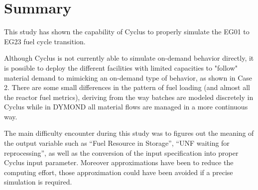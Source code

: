 \documentclass[12pt]{article}
\begin{document}
\section{Summary}

This study has shown the capability of Cyclus to properly simulate the EG01 to
EG23 fuel cycle transition.   

Although Cyclus is not currently able to simulate on-demand behavior directly,
it is possible to deploy the different facilities with limited capacities to
"follow" material demand to mimicking an on-demand type of behavior, as shown in
Case 2. There are some small differences in the pattern of fuel
loading (and almost all the reactor fuel metrics), deriving from the way
batches are modeled discretely in Cyclus while in DYMOND all 
material flows are managed in a more continuous way.

The main difficulty encounter during this study was to figures out the meaning
of the output variable such as ``Fuel Resource in Storage'', ``UNF waiting for
reprocessing'', as well as the conversion of the input specification into proper
Cyclus input parameter. Moreover approximations have been to reduce the
computing effort, those approximation could have been avoided if a precise
simulation is required.







\end{document}
